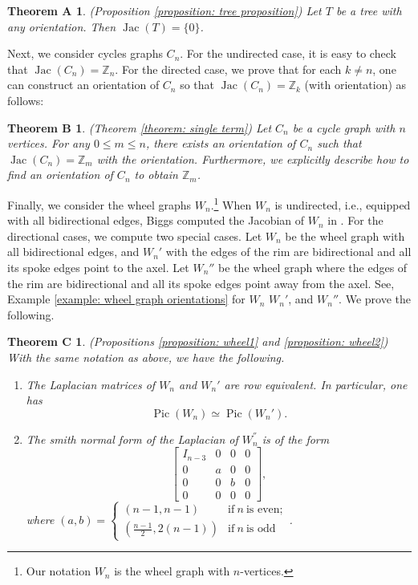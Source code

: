 \documentclass[11pt,reqno]{amsart}
\DeclareMathOperator{\Pic}{Pic}
\DeclareMathOperator{\Jac}{Jac}
\theoremstyle{definition}
\theoremstyle{plain}
\newtheorem*{nothma}{Theorem A}
\newtheorem*{nothmb}{Theorem B}
\newtheorem*{nothmc}{Theorem C}
\begin{document}
\begin{nothma}(Proposition \ref{proposition: tree proposition})
Let $T$ be a tree with any orientation. Then $\Jac(T)=\{0\}$. 
\end{nothma}

Next, we consider cycles graphs $C_n$. For the undirected case, it is easy to check that $\Jac(C_n)=\mathbb{Z}_n$. For the directed case, we prove that for each $k \neq n$, one can construct an orientation of $C_n$ so that $\Jac(C_n)=\mathbb{Z}_k$ (with orientation) as follows:

\begin{nothmb}(Theorem \ref{theorem: single term})
Let $C_n$ be a cycle graph with $n$ vertices. For any $0 \leq m \leq n$, there exists an orientation of $C_n$ such that $\Jac(C_n)=\mathbb{Z}_m$ with the orientation. Furthermore, we explicitly describe how to find an orientation of $C_n$ to obtain $\mathbb{Z}_m$. 
\end{nothmb}

Finally, we consider the wheel graphs $W_n$.\footnote{Our notation $W_n$ is the wheel graph with $n$-vertices.} When $W_n$ is undirected, i.e., equipped with all bidirectional edges, Biggs computed the Jacobian of $W_n$ in \cite{biggs1999chip}. For the directional cases, we compute two special cases. Let $W_n$ be the wheel graph with all bidirectional edges, and $W_n'$ with the edges of the rim are bidirectional and all its spoke edges point to the axel. Let $W_n{''}$ be the wheel graph where the edges of the rim are bidirectional and all its spoke edges point away from the axel. See, Example \ref{example: wheel graph orientations} for $W_n$ $W_n'$, and $W_n''$. We prove the following.

\begin{nothmc}(Propositions \ref{proposition: wheel1} and \ref{proposition: wheel2})
With the same notation as above, we have the following. 
\begin{enumerate}
\item 
The Laplacian matrices of $W_n$ and $W_n'$ are row equivalent. In particular, one has 
\[
\Pic (W_n) \simeq \Pic (W_n').
\]
\item 
The smith normal form of the Laplacian of $W_n^{''}$ is of the form 
\begin{equation*}
\left[
\begin{array}{c|ccc}	
I_{n-3} & 0 & 0 & 0 \\
\hline
0 & a & 0 & 0 \\
0 & 0 & b & 0 \\
0 & 0 & 0 & 0 
\end{array}
\right],
\end{equation*}
where 
$(a,b) = \begin{cases}
(n-1,n-1) & \text{if}~ n ~\text{is even}; \\
(\frac{n-1}2, 2(n-1)) & \text{if}~ n ~\text{is odd}
\end{cases}$.	
\end{enumerate}
\end{nothmc}
\vspace{0.2cm}
\end{document}
